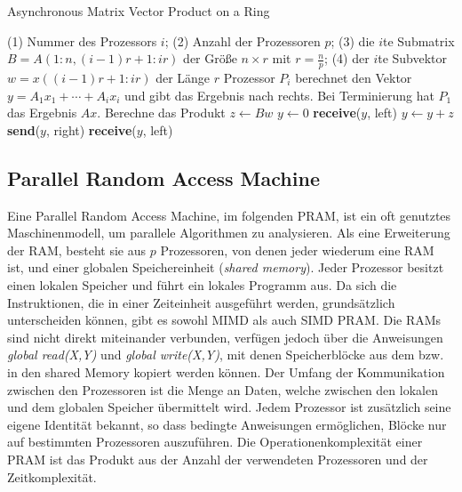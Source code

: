 \begin{algorithm}
    \caption{Asynchronous Matrix Vector Product on a Ring \cite[S.18]{jaja}}
    \begin{algorithmic}[1]
    \Require (1) Nummer des Prozessors $i$; (2) Anzahl der Prozessoren $p$;
    (3) die $i$te Submatrix $B = A(1:n, (i-1)r+1:ir)$ der Größe $n \times r$
        mit $r = \frac{n}{p}$;
    (4) der $i$te Subvektor $w = x((i-1)r+1:ir)$ der Länge $r$
    \Ensure Prozessor $P_i$ berechnet den Vektor $y = A_1x_1 + \cdots + A_ix_i$
    und gibt das Ergebnis nach rechts. Bei Terminierung hat $P_1$ das
    Ergebnis $Ax$.
    \State Berechne das Produkt $z \gets Bw$
        \State $y \gets 0$
    \Else
        \State \textbf{receive}($y$, left)
    \EndIf
    \State $y \gets y + z$
    \State \textbf{send}($y$, right)
        \State \textbf{receive}($y$, left)
    \EndIf
    \end{algorithmic}
\end{algorithm}


\subsection{Parallel Random Access Machine}
Eine Parallel Random Access Machine, im folgenden PRAM, ist ein oft genutztes
Maschinenmodell, um parallele Algorithmen zu analysieren.
Als eine Erweiterung der RAM, besteht sie aus $p$ Prozessoren, von denen jeder
wiederum eine RAM ist, und einer globalen Speichereinheit
(\emph{shared memory}).
Jeder Prozessor besitzt einen lokalen Speicher und führt ein lokales Programm
aus.
Da sich die Instruktionen, die in einer Zeiteinheit ausgeführt werden,
grundsätzlich unterscheiden können, gibt es sowohl MIMD als auch SIMD PRAM.
Die RAMs sind nicht direkt miteinander verbunden, verfügen jedoch über die
Anweisungen \emph{global read(X,Y)} und \emph{global write(X,Y)}, mit denen
Speicherblöcke aus dem bzw. in den shared Memory kopiert werden können.
Der Umfang der Kommunikation zwischen den Prozessoren ist die Menge an Daten,
welche zwischen den lokalen und dem globalen Speicher übermittelt wird.
Jedem Prozessor ist zusätzlich seine eigene Identität bekannt, so dass bedingte
Anweisungen ermöglichen, Blöcke nur auf bestimmten Prozessoren auszuführen.
Die Operationenkomplexität einer PRAM ist das Produkt aus der Anzahl der
verwendeten Prozessoren und der Zeitkomplexität.
\cite[S.9ff.]{jaja}


